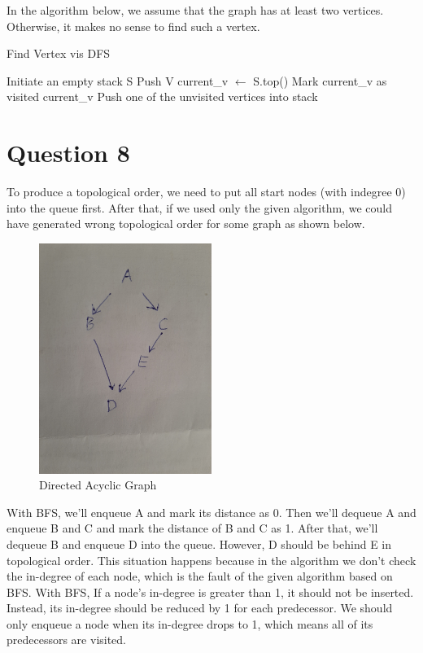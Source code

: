 \documentclass[11pt]{article}
\begin{document}
In the algorithm below, we assume that the graph has at least two vertices. Otherwise, it makes no sense to find such a vertex.

\begin{algorithm}
\caption{Find Vertex vis DFS}
\begin{algorithmic}[1]
\State Initiate an empty stack S
\State Push V
\State current\_v $\gets$ S.top()
\State Mark current\_v as visited
	\State \Return current\_v
\Else
	\State Push one of the unvisited vertices into stack
\EndIf
\EndWhile
\EndProcedure
\end{algorithmic}
\end{algorithm}

\section{Question 8}
To produce a topological order, we need to put all start nodes (with indegree 0) into the queue first. After that, if we used only the given algorithm, we could have generated wrong topological order for some graph as shown below.

 \begin{figure}[hbt!]
  \centering
    \includegraphics[width=0.5\textwidth, angle =-90]{Figures/q8.jpg}
  \caption{Directed Acyclic Graph}
\end{figure}

\newpage
With BFS, we'll enqueue A  and mark its distance as 0. Then we'll dequeue A and enqueue B and C and mark the distance of B and C as 1. After that, we'll dequeue B and enqueue D into the queue. However, D should be behind E in topological order.
This situation happens because in the algorithm we don't check the in-degree of each node, which is the fault of the given algorithm based on BFS. With BFS, If a node's in-degree is greater than 1, it should not be inserted. Instead, its in-degree should be reduced by 1 for each predecessor. We should only enqueue a node when its in-degree drops to 1, which means all of its predecessors are visited.  
\end{document}
